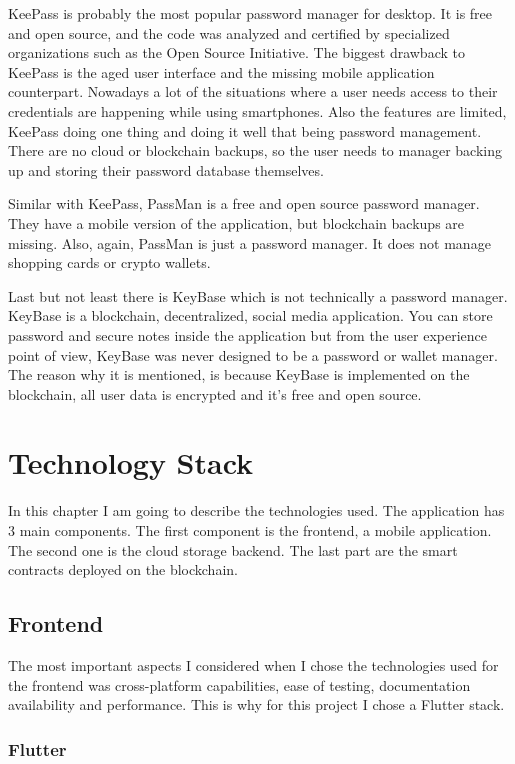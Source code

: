 \documentclass[a4paper,12pt]{report}
\begin{document}
KeePass\cite{keepass} is probably the most popular password manager for
desktop. It is free and open source, and the code was analyzed and certified by
specialized organizations such as the Open Source Initiative. The biggest
drawback to KeePass is the aged user interface and the missing mobile
application counterpart. Nowadays a lot of the situations where a user needs
access to their credentials are happening while using smartphones. Also the
features are limited, KeePass doing one thing and doing it well that being
password management. There are no cloud or blockchain backups, so the user
needs to manager backing up and storing their password database themselves.

Similar with KeePass, PassMan\cite{passman} is a free and open source password
manager. They have a mobile version of the application, but blockchain backups
are missing. Also, again, PassMan is just a password manager. It does not
manage shopping cards or crypto wallets.

Last but not least there is KeyBase\cite{keybase} which is not technically a
password manager. KeyBase is a blockchain, decentralized, social media
application. You can store password and secure notes inside the application but
from the user experience point of view, KeyBase was never designed to be a
password or wallet manager. The reason why it is mentioned, is because KeyBase
is implemented on the blockchain, all user data is encrypted and it's free and
open source.

\chapter{Technology Stack}

In this chapter I am going to describe the technologies used. The application
has 3 main components. The first component is the frontend, a mobile
application. The second one is the cloud storage backend. The last part are the
smart contracts deployed on the blockchain.

\section{Frontend}

The most important aspects I considered when I chose the technologies used for
the frontend was cross-platform capabilities, ease of testing, documentation
availability and performance. This is why for this project I chose a Flutter
stack.

\subsection{Flutter}
\end{document}
